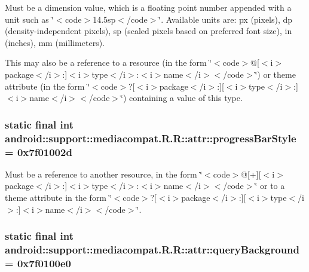 Must be a dimension value, which is a floating point number appended with a unit such as \char`\"{}$<$code$>$14.5sp$<$/code$>$\char`\"{}. Available units are: px (pixels), dp (density-independent pixels), sp (scaled pixels based on preferred font size), in (inches), mm (millimeters). 

This may also be a reference to a resource (in the form \char`\"{}$<$code$>$@\mbox{[}$<$i$>$package$<$/i$>$:\mbox{]}$<$i$>$type$<$/i$>$:$<$i$>$name$<$/i$>$$<$/code$>$\char`\"{}) or theme attribute (in the form \char`\"{}$<$code$>$?\mbox{[}$<$i$>$package$<$/i$>$:\mbox{]}\mbox{[}$<$i$>$type$<$/i$>$:\mbox{]}$<$i$>$name$<$/i$>$$<$/code$>$\char`\"{}) containing a value of this type. \hypertarget{classandroid_1_1support_1_1mediacompat_1_1_r_1_1attr_db04b73363ed74356354b97c0a509ece}{
\subsubsection[{progressBarStyle}]{\setlength{\rightskip}{0pt plus 5cm}static final int android::support::mediacompat.R.R::attr::progressBarStyle = 0x7f01002d}}
\label{classandroid_1_1support_1_1mediacompat_1_1_r_1_1attr_db04b73363ed74356354b97c0a509ece}


Must be a reference to another resource, in the form \char`\"{}$<$code$>$@\mbox{[}+\mbox{]}\mbox{[}$<$i$>$package$<$/i$>$:\mbox{]}$<$i$>$type$<$/i$>$:$<$i$>$name$<$/i$>$$<$/code$>$\char`\"{} or to a theme attribute in the form \char`\"{}$<$code$>$?\mbox{[}$<$i$>$package$<$/i$>$:\mbox{]}\mbox{[}$<$i$>$type$<$/i$>$:\mbox{]}$<$i$>$name$<$/i$>$$<$/code$>$\char`\"{}. \hypertarget{classandroid_1_1support_1_1mediacompat_1_1_r_1_1attr_80db982ae541be8affed07bb982694d0}{
\subsubsection[{queryBackground}]{\setlength{\rightskip}{0pt plus 5cm}static final int android::support::mediacompat.R.R::attr::queryBackground = 0x7f0100e0}}
\label{classandroid_1_1support_1_1mediacompat_1_1_r_1_1attr_80db982ae541be8affed07bb982694d0}


